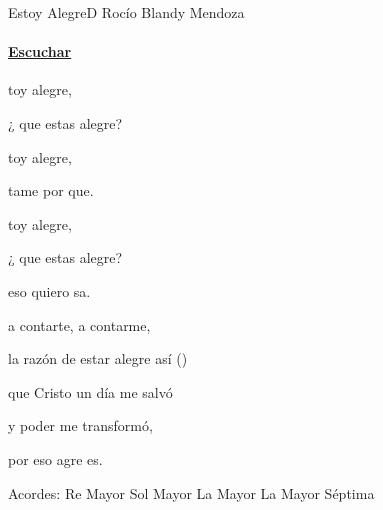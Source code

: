 \documentclass[12pt, spanish]{book}
\begin{document}
    \begin{song}{Estoy Alegre}{D}
        {} %
        {Rocío Blandy Mendoza}
        {} %
        {}
        \ifChordBk
        \paragraph{\mbox{}\hfill\protect\href{https://open.spotify.com/intl-es/track/2jbMpzd5ikmPdMNYDQVmfe}{Escuchar}\mbox{}\hfill}
        \fi

        \begin{SBOpGroup}
            toy alegre,

            ¿ que estas alegre?

            toy alegre,

            tame por que.

            toy alegre,

            ¿ que estas alegre?

            eso quiero  sa.
        \end{SBOpGroup}

        \begin{SBChorus}
             a contarte,  a contarme,

            la razón de estar alegre así ()

            que Cristo un día me salvó

            y  poder me transformó,

             por eso agre es.
        \end{SBChorus}

        \ifChordBk
        \begin{SBOpGroup}
            Acordes:
            \upchord{\D}\qquad Re Mayor \hfill
            \upchord{\G}\qquad Sol Mayor \hfill\null\break
            \upchord{\A}\qquad La Mayor \hfill
            \upchord{\Aseven}\qquad La Mayor S\'eptima \hfill\null\break
        \end{SBOpGroup}
        \fi
    \end{song}
\end{document}
